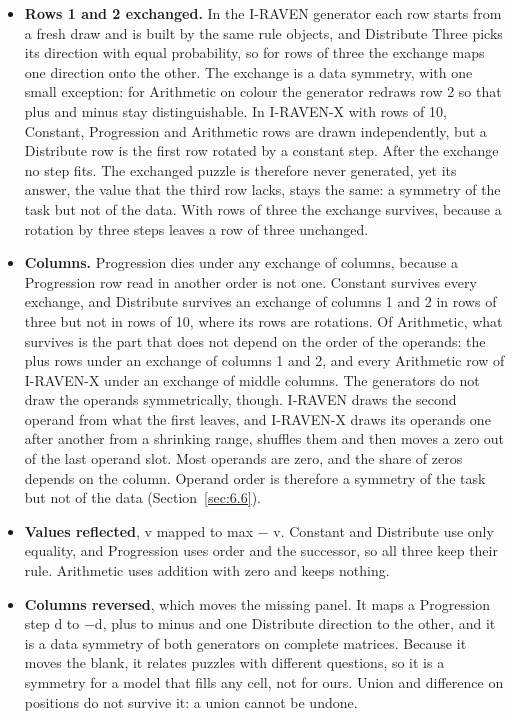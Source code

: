 \begin{itemize}
\item \textbf{Rows 1 and 2 exchanged.} In the I-RAVEN generator each row starts from a fresh draw and is built by the same rule objects, and Distribute Three picks its direction with equal probability, so for rows of three the exchange maps one direction onto the other. The exchange is a data symmetry, with one small exception: for Arithmetic on colour the generator redraws row 2 so that plus and minus stay distinguishable. In I-RAVEN-X with rows of 10, Constant, Progression and Arithmetic rows are drawn independently, but a Distribute row is the first row rotated by a constant step. After the exchange no step fits. The exchanged puzzle is therefore never generated, yet its answer, the value that the third row lacks, stays the same: a symmetry of the task but not of the data. With rows of three the exchange survives, because a rotation by three steps leaves a row of three unchanged.
\item \textbf{Columns.} Progression dies under any exchange of columns, because a Progression row read in another order is not one. Constant survives every exchange, and Distribute survives an exchange of columns 1 and 2 in rows of three but not in rows of 10, where its rows are rotations. Of Arithmetic, what survives is the part that does not depend on the order of the operands: the plus rows under an exchange of columns 1 and 2, and every Arithmetic row of I-RAVEN-X under an exchange of middle columns. The generators do not draw the operands symmetrically, though. I-RAVEN draws the second operand from what the first leaves, and I-RAVEN-X draws its operands one after another from a shrinking range, shuffles them and then moves a zero out of the last operand slot. Most operands are zero, and the share of zeros depends on the column. Operand order is therefore a symmetry of the task but not of the data (Section~\ref{sec:6.6}).
\item \textbf{Values reflected}, v mapped to max − v. Constant and Distribute use only equality, and Progression uses order and the successor, so all three keep their rule. Arithmetic uses addition with zero and keeps nothing.
\item \textbf{Columns reversed}, which moves the missing panel. It maps a Progression step d to −d, plus to minus and one Distribute direction to the other, and it is a data symmetry of both generators on complete matrices. Because it moves the blank, it relates puzzles with different questions, so it is a symmetry for a model that fills any cell, not for ours. Union and difference on positions do not survive it: a union cannot be undone.

\end{itemize}
